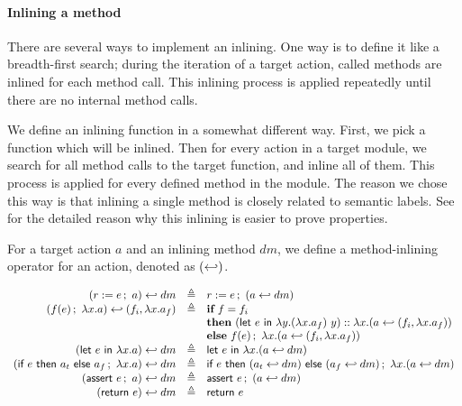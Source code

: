 \paragraph{Inlining a method}
There are several ways to implement an inlining. One way is to define
it like a breadth-first search; during the iteration of a target
action, called methods are inlined for each method call. This inlining
process is applied repeatedly until there are no internal method
calls.

We define an inlining function in a somewhat different way. First, we
pick a function which will be inlined. Then for every action in a
target module, we search for all method calls to the target function,
and inline all of them. This process is applied for every defined
method in the module. The reason we chose this way is that inlining a
single method is closely related to semantic labels. See
 for the detailed reason why this inlining is easier to
prove properties.

For a target action $a$ and an inlining method $dm$, we define a
method-inlining operator for an action, denoted as $(\inlinedmsymb)$.

\begin{definition}
  \label{def-inlinedm}
  \mbox{}
  \begin{center}
    \begin{math}
      \begin{array}{rcl}
        \inlinedm{(\actwrite{r}{e}{a})}{dm} & \triangleq &
        \actwrite{r}{e}{(\inlinedm{a}{dm})} \\
        \inlinedm{(\actcall{x}{f}{e}{a})}{(f_i, \lambda x.a_f)} & \triangleq &
        \pgmif{} f = f_i \\
        & & \pgmthen{} \concataction{(\actlet{e}{y}{(\lambda x.a_f)\ y})}{(\inlinedm{a}{(f_i, \lambda x.a_f)})} \\
        & & \pgmelse{} \actcall{x}{f}{e}{(\inlinedm{a}{(f_i, \lambda x.a_f)})} \\
        \inlinedm{(\actlet{e}{x}{a})}{dm} & \triangleq &
        \actlet{e}{x}{(\inlinedm{a}{dm})} \\
        \inlinedm{(\actifelse{e}{a_t}{a_f}{x}{a})}{dm} & \triangleq &
        \actifelse{e}{(\inlinedm{a_t}{dm})}{(\inlinedm{a_f}{dm})}{x}{(\inlinedm{a}{dm})} \\
        \inlinedm{(\actassert{e}{a})}{dm} & \triangleq &
        \actassert{e}{(\inlinedm{a}{dm})} \\
        \inlinedm{(\actret{e})}{dm} & \triangleq & \actret{e} \\
      \end{array}
    \end{math}
  \end{center}
\end{definition}

